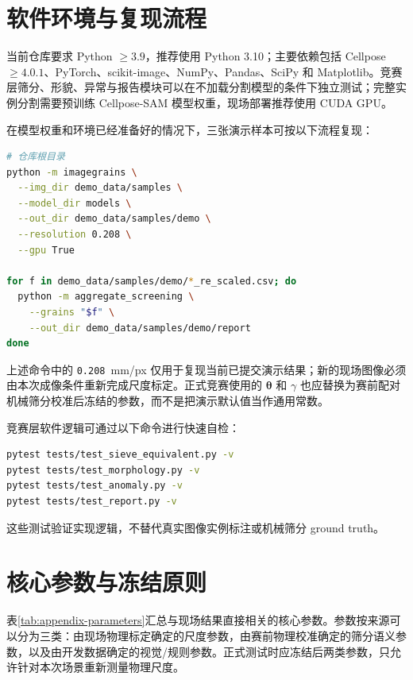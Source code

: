 \clearpage
\appendix

\section{软件环境与复现流程}
\label{app:reproducibility}

当前仓库要求 Python $\geq3.9$，推荐使用 Python 3.10；主要依赖包括 Cellpose $\geq4.0.1$、PyTorch、scikit-image、NumPy、Pandas、SciPy 和 Matplotlib。竞赛层筛分、形貌、异常与报告模块可以在不加载分割模型的条件下独立测试；完整实例分割需要预训练 Cellpose-SAM 模型权重，现场部署推荐使用 CUDA GPU。

在模型权重和环境已经准备好的情况下，三张演示样本可按以下流程复现：
\begin{lstlisting}[language=bash,caption={从图像到筛分报告的最小复现流程。}]
# 仓库根目录
python -m imagegrains \
  --img_dir demo_data/samples \
  --model_dir models \
  --out_dir demo_data/samples/demo \
  --resolution 0.208 \
  --gpu True

for f in demo_data/samples/demo/*_re_scaled.csv; do
  python -m aggregate_screening \
    --grains "$f" \
    --out_dir demo_data/samples/demo/report
done
\end{lstlisting}

上述命令中的 \texttt{0.208}~mm/px 仅用于复现当前已提交演示结果；新的现场图像必须由本次成像条件重新完成尺度标定。正式竞赛使用的 $\boldsymbol{\theta}$ 和 $\gamma$ 也应替换为赛前配对机械筛分校准后冻结的参数，而不是把演示默认值当作通用常数。

竞赛层软件逻辑可通过以下命令进行快速自检：
\begin{lstlisting}[language=bash,caption={竞赛层合成单元测试。}]
pytest tests/test_sieve_equivalent.py -v
pytest tests/test_morphology.py -v
pytest tests/test_anomaly.py -v
pytest tests/test_report.py -v
\end{lstlisting}

这些测试验证实现逻辑，不替代真实图像实例标注或机械筛分 ground truth。

\section{核心参数与冻结原则}
\label{app:parameters}

表\ref{tab:appendix-parameters}汇总与现场结果直接相关的核心参数。参数按来源可以分为三类：由现场物理标定确定的尺度参数，由赛前物理校准确定的筛分语义参数，以及由开发数据确定的视觉/规则参数。正式测试时应冻结后两类参数，只允许针对本次场景重新测量物理尺度。

